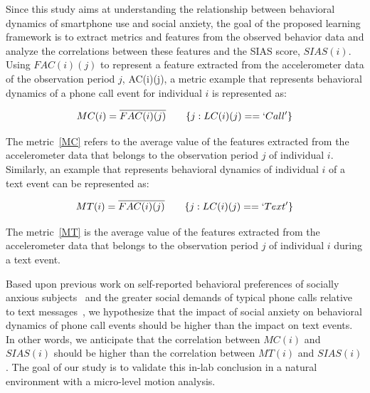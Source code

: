 Since this study aims at understanding the relationship between behavioral dynamics of smartphone use and social anxiety, the goal of the proposed learning framework is to extract metrics and features from the observed behavior data and analyze the correlations between these features and the SIAS score, $SIAS(i)$. Using $FAC(i)(j)$ to represent a feature extracted from the accelerometer data of the observation period $j$, AC(i)(j), a metric example that represents behavioral dynamics of a phone call event for individual $i$ is represented as:

\begin{equation}
\label{MC}
MC(i)=\overline{FAC(i)(j)} \qquad \{j: LC(i)(j) == `Call'\} 
\end{equation}



The metric~\ref{MC} refers to the average value of the features extracted from the accelerometer data that belongs to the observation period $j$ of individual $i$. Similarly, an example that represents behavioral dynamics of individual $i$ of a text event can be represented as:

\begin{equation}
\label{MT}
MT(i)=\overline{FAC(i)(j)} \qquad \{j: LC(i)(j) == `Text'\}
\end{equation}

The metric~\ref{MT} is the average value of the features extracted from the accelerometer data  that belongs to the observation period $j$ of individual $i$ during a text event.

Based upon previous work on self-reported behavioral preferences of socially anxious subjects~\cite{reid2007text} and the greater social demands of typical phone calls relative to text messages~\cite{reid2004insights}, we hypothesize that the impact of social anxiety on behavioral dynamics of phone call events should be higher than the impact on text events. In other words, we anticipate that the correlation between $MC(i)$ and $SIAS(i)$ should be higher than the correlation between $MT(i)$ and $SIAS(i)$. The goal of our study is to validate this in-lab conclusion in a natural environment with a micro-level motion analysis.


